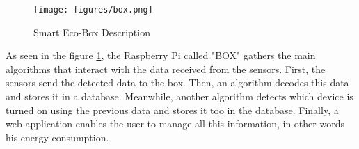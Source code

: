 \begin{figure}[H]
\centering
\texttt{[image: figures/box.png]}
\caption{Smart Eco-Box Description}
\label{fig:boxDescription}
\end{figure}

As seen in the figure \ref{fig:boxDescription}, the Raspberry Pi called "BOX" gathers the main algorithms that interact with the data received from the sensors. First, the sensors send the detected data to the box. Then, an algorithm decodes this data and stores it in a database. Meanwhile, another algorithm detects which device is turned on using the previous data and stores it too in the database. Finally, a web application enables the user to manage all this information, in other words his energy consumption.

